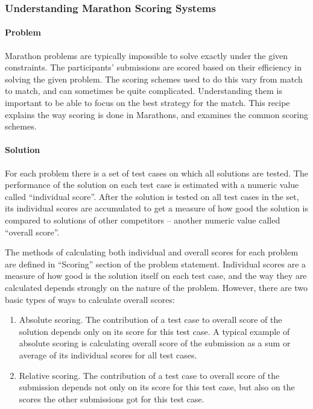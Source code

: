 \hypertarget{understanding-marathon-scoring-systems}{%
\subsubsection{Understanding Marathon Scoring
Systems}\label{understanding-marathon-scoring-systems}}

\hypertarget{problem-3}{%
\paragraph{Problem}\label{problem-3}}

Marathon problems are typically impossible to solve exactly under the
given constraints. The participants' submissions are scored based on
their efficiency in solving the given problem. The scoring schemes used
to do this vary from match to match, and can sometimes be quite
complicated. Understanding them is important to be able to focus on the
best strategy for the match. This recipe explains the way scoring is
done in Marathons, and examines the common scoring schemes.

\hypertarget{solution-3}{%
\paragraph{Solution}\label{solution-3}}

For each problem there is a set of test cases on which all solutions are
tested. The performance of the solution on each test case is estimated
with a numeric value called ``individual score''. After the solution is
tested on all test cases in the set, its individual scores are
accumulated to get a measure of how good the solution is compared to
solutions of other competitors -- another numeric value called ``overall
score''.

The methods of calculating both individual and overall scores for each
problem are defined in ``Scoring'' section of the problem statement.
Individual scores are a measure of how good is the solution itself on
each test case, and the way they are calculated depends strongly on the
nature of the problem. However, there are two basic types of ways to
calculate overall scores:

\begin{enumerate}
\def\labelenumi{\arabic{enumi}.}
\item
  Absolute scoring. The contribution of a test case to overall score of
  the solution depends only on its score for this test case. A typical
  example of absolute scoring is calculating overall score of the
  submission as a sum or average of its individual scores for all test
  cases.
\item
  Relative scoring. The contribution of a test case to overall score of
  the submission depends not only on its score for this test case, but
  also on the scores the other submissions got for this test case.
\end{enumerate}

